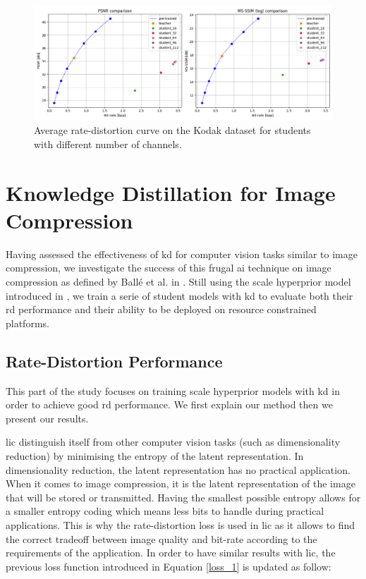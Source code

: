 \begin{figure}
    \centering
    \includegraphics[width=15cm]{img/kd_ae_rd.png}
    \caption[Average rate-distortion curve on the Kodak dataset for students with different number of channels.]{Average rate-distortion curve on the Kodak dataset for students with different number of channels.}
    \label{kd_ae_2}
\end{figure}

\section{Knowledge Distillation for Image Compression}
Having assessed the effectiveness of \acrshort{kd} for computer vision tasks similar to image compression, we investigate the success of this frugal \acrshort{ai} technique on image compression as defined by Ballé et al. in \cite{ballé2016endtoendoptimizationnonlineartransform}. Still using the scale hyperprior model introduced in \cite{ballé2018variationalimagecompressionscale}, we train a serie of student models with \acrshort{kd} to evaluate both their \acrshort{rd} performance and their ability to be deployed on resource constrained platforms.

\subsection{Rate-Distortion Performance}
This part of the study focuses on training scale hyperprior models with \acrshort{kd} in order to achieve good \acrshort{rd} performance. We first explain our method then we present our results.

\acrshort{lic} distinguish itself from other computer vision tasks (such as dimensionality reduction) by minimising the entropy of the latent representation. In dimensionality reduction, the latent representation has no practical application. When it comes to image compression, it is the latent representation of the image that will be stored or transmitted. Having the smallest possible entropy allows for a smaller entropy coding which means less bits to handle during practical applications. This is why the rate-distortion loss is used in \acrshort{lic} as it allows to find the correct tradeoff between image quality and bit-rate according to the requirements of the application. In order to have similar results with \acrshort{lic}, the previous loss function introduced in Equation \eqref{loss_1} is updated as follow:

